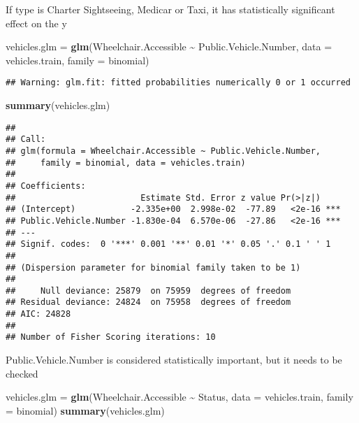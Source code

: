 \documentclass[
]{article}
\newenvironment{Shaded}{\begin{snugshade}}{\end{snugshade}}
\newcommand{\AttributeTok}[1]{\textcolor[rgb]{0.13,0.29,0.53}{#1}}
\newcommand{\FunctionTok}[1]{\textcolor[rgb]{0.13,0.29,0.53}{\textbf{#1}}}
\newcommand{\NormalTok}[1]{#1}
\newcommand{\OtherTok}[1]{\textcolor[rgb]{0.56,0.35,0.01}{#1}}
\newcommand{\SpecialCharTok}[1]{\textcolor[rgb]{0.81,0.36,0.00}{\textbf{#1}}}
\begin{document}
If type is Charter Sightseeing, Medicar or Taxi, it has statistically
significant effect on the y

\begin{Shaded}
\begin{Highlighting}[]
\NormalTok{vehicles.glm }\OtherTok{=} \FunctionTok{glm}\NormalTok{(Wheelchair.Accessible }\SpecialCharTok{\textasciitilde{}}\NormalTok{ Public.Vehicle.Number, }\AttributeTok{data =}\NormalTok{ vehicles.train, }
                   \AttributeTok{family =}\NormalTok{ binomial)}
\end{Highlighting}
\end{Shaded}

\begin{verbatim}
## Warning: glm.fit: fitted probabilities numerically 0 or 1 occurred
\end{verbatim}

\begin{Shaded}
\begin{Highlighting}[]
\FunctionTok{summary}\NormalTok{(vehicles.glm)}
\end{Highlighting}
\end{Shaded}

\begin{verbatim}
## 
## Call:
## glm(formula = Wheelchair.Accessible ~ Public.Vehicle.Number, 
##     family = binomial, data = vehicles.train)
## 
## Coefficients:
##                         Estimate Std. Error z value Pr(>|z|)    
## (Intercept)           -2.335e+00  2.998e-02  -77.89   <2e-16 ***
## Public.Vehicle.Number -1.830e-04  6.570e-06  -27.86   <2e-16 ***
## ---
## Signif. codes:  0 '***' 0.001 '**' 0.01 '*' 0.05 '.' 0.1 ' ' 1
## 
## (Dispersion parameter for binomial family taken to be 1)
## 
##     Null deviance: 25879  on 75959  degrees of freedom
## Residual deviance: 24824  on 75958  degrees of freedom
## AIC: 24828
## 
## Number of Fisher Scoring iterations: 10
\end{verbatim}

Public.Vehicle.Number is considered statistically important, but it
needs to be checked

\begin{Shaded}
\begin{Highlighting}[]
\NormalTok{vehicles.glm }\OtherTok{=} \FunctionTok{glm}\NormalTok{(Wheelchair.Accessible }\SpecialCharTok{\textasciitilde{}}\NormalTok{ Status, }\AttributeTok{data =}\NormalTok{ vehicles.train, }
                   \AttributeTok{family =}\NormalTok{ binomial)}
\FunctionTok{summary}\NormalTok{(vehicles.glm)}
\end{Highlighting}
\end{Shaded}
\end{document}
